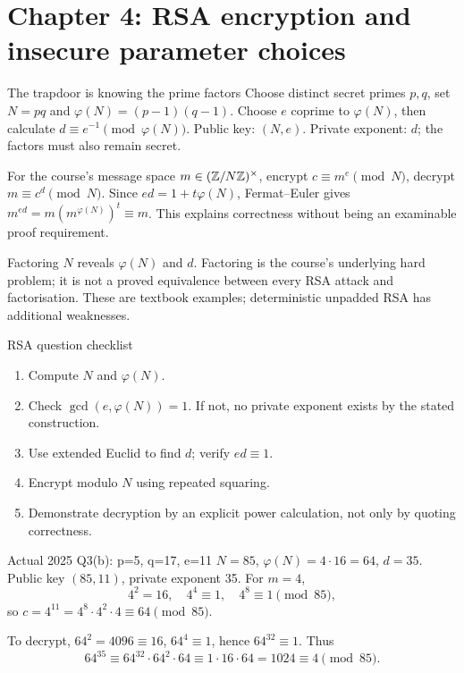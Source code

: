 \documentclass[11pt,a4paper]{article}
\begin{document}
\section{Chapter 4: RSA encryption and insecure parameter choices}
\begin{concept}{The trapdoor is knowing the prime factors}
Choose distinct secret primes \(p,q\), set \(N=pq\) and \(\varphi(N)=(p-1)(q-1)\). Choose \(e\) coprime to \(\varphi(N)\), then calculate \(d\equiv e^{-1}\pmod{\varphi(N)}\). Public key: \((N,e)\). Private exponent: \(d\); the factors must also remain secret.

For the course's message space \(m\in(\mathbb Z/N\mathbb Z)^\times\), encrypt \(c\equiv m^e\pmod N\), decrypt \(m\equiv c^d\pmod N\). Since \(ed=1+t\varphi(N)\), Fermat--Euler gives \(m^{ed}=m(m^{\varphi(N)})^t\equiv m\). This explains correctness without being an examinable proof requirement.

Factoring \(N\) reveals \(\varphi(N)\) and \(d\). Factoring is the course's underlying hard problem; it is not a proved equivalence between every RSA attack and factorisation. These are textbook examples; deterministic unpadded RSA has additional weaknesses.
\end{concept}
\begin{method}{RSA question checklist}
\begin{enumerate}
\item Compute \(N\) and \(\varphi(N)\).
\item Check \(\gcd(e,\varphi(N))=1\). If not, no private exponent exists by the stated construction.
\item Use extended Euclid to find \(d\); verify \(ed\equiv1\).
\item Encrypt modulo \(N\) using repeated squaring.
\item Demonstrate decryption by an explicit power calculation, not only by quoting correctness.
\end{enumerate}
\end{method}
\begin{example}{Actual 2025 Q3(b): p=5, q=17, e=11}
\(N=85\), \(\varphi(N)=4\cdot16=64\), \(d=35\). Public key \((85,11)\), private exponent 35. For \(m=4\),
\[4^2=16,\quad4^4\equiv1,\quad4^8\equiv1\pmod{85},\]
so \(c=4^{11}=4^8\cdot4^2\cdot4\equiv64\pmod{85}\).

To decrypt, \(64^2=4096\equiv16\), \(64^4\equiv1\), hence \(64^{32}\equiv1\). Thus
\[64^{35}\equiv64^{32}\cdot64^2\cdot64\equiv1\cdot16\cdot64=1024\equiv4\pmod{85}.\]
\end{example}
\end{document}
